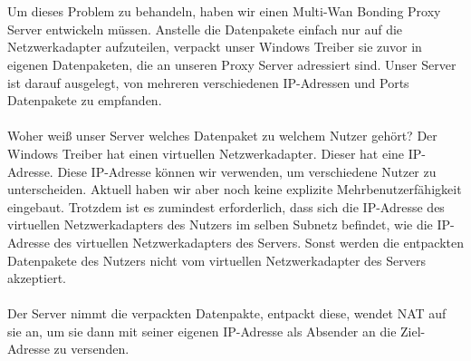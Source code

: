 \\\\
Um dieses Problem zu behandeln, haben wir einen Multi-Wan Bonding Proxy Server entwickeln müssen. Anstelle die Datenpakete einfach nur auf die Netzwerkadapter aufzuteilen, verpackt unser Windows Treiber sie zuvor in eigenen Datenpaketen, die an unseren Proxy Server adressiert sind. Unser Server ist darauf ausgelegt, von mehreren verschiedenen IP-Adressen und Ports Datenpakete zu empfanden. 
\\\\
Woher weiß unser Server welches Datenpaket zu welchem Nutzer gehört? Der Windows Treiber hat einen virtuellen Netzwerkadapter. Dieser hat eine IP-Adresse. Diese IP-Adresse können wir verwenden, um verschiedene Nutzer zu unterscheiden. Aktuell haben wir aber noch keine explizite Mehrbenutzerfähigkeit eingebaut. Trotzdem ist es zumindest erforderlich, dass sich die IP-Adresse des virtuellen Netzwerkadapters des Nutzers im selben Subnetz befindet, wie die IP-Adresse des virtuellen Netzwerkadapters des Servers. Sonst werden die entpackten Datenpakete des Nutzers nicht vom virtuellen Netzwerkadapter des Servers akzeptiert.
\\\\
Der Server nimmt die verpackten Datenpakte, entpackt diese, wendet NAT auf sie an, um sie dann mit seiner eigenen IP-Adresse als Absender an die Ziel-Adresse zu versenden.

